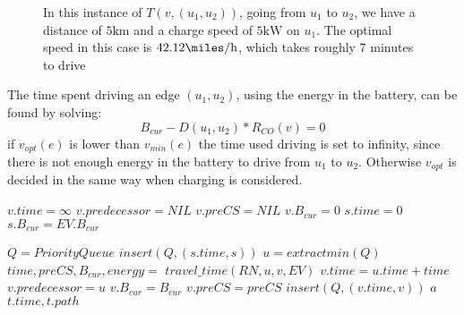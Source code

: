 \begin{figure}[!htb]
\label{fig:graph}
% 
\caption{In this instance of $T(v,(u_1, u_2))$, going from $u_1$ to $u_2$, we have a distance of $5 \si{\km}$ and a charge speed of $5 \si{\kW}$ on $u_1$. The optimal speed in this case is $42.12\si{\miles\per\hour}$, which takes roughly 7 minutes to drive}
\end{figure}

The time spent driving an edge $(u_1, u_2)$, using the energy in the battery, can be found by solving:
\[B_{cur} - D(u_1, u_2) * R_{CO}(v) = 0\] 
if $v_{opt}(e)$ is lower than $v_{min}(e)$ the time used driving is set to infinity, since there is not enough energy in the battery to drive from $u_1$ to $u_2$. Otherwise $v_{opt}$ is decided in the same way when charging is considered.


\begin{algorithmic}
		\State $v.time = \infty$
		\State $v.predecessor = NIL$
		\State $v.preCS = NIL$
		\State $v.B_{cur} = 0$
	\EndFor
	\State $s.time = 0$
	\State $s.B_{cur} = EV.B_{cur}$

	\State $Q = PriorityQueue$
	\State $insert(Q, (s.time, s))$	
		\State $u = extractmin(Q)$
			\State $time,preCS,B_{cur},energy = $
			\State $travel\_time(RN, u, v, EV)$
				\State $v.time = u.time + time$
				\State $v.predecessor = u$
				\State $v.B_{cur} = B_{cur}$
				\State $v.preCS = preCS$
				\State $insert(Q, (v.time, v))$	
			\EndIf
				\State $a$
			\EndIf
		\EndFor
	\EndWhile
	\State \Return $t.time, t.path$
\EndFunction
\end{algorithmic}\label{alg:fastest_path}


